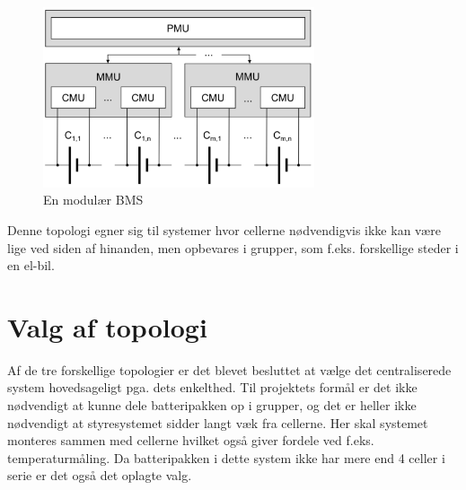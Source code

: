 \begin{figure}[h]
	\centering
	\includegraphics[width=8cm]{billeder/modular.png}
	\caption{En modulær BMS}
	\label{fig:modular_BMS}
\end{figure}

Denne topologi egner sig til systemer hvor cellerne nødvendigvis ikke kan være lige ved siden af hinanden, men opbevares i grupper, som f.eks. forskellige steder i en el-bil.

\section{Valg af topologi}
Af de tre forskellige topologier er det blevet besluttet at vælge det centraliserede system hovedsageligt pga. dets enkelthed. Til projektets formål er det ikke nødvendigt at kunne dele batteripakken op i grupper, og det er heller ikke nødvendigt at styresystemet sidder langt væk fra cellerne. Her skal systemet monteres sammen med cellerne hvilket også giver fordele ved f.eks. temperaturmåling. Da batteripakken i dette system ikke har mere end 4 celler i serie er det også det oplagte valg. 